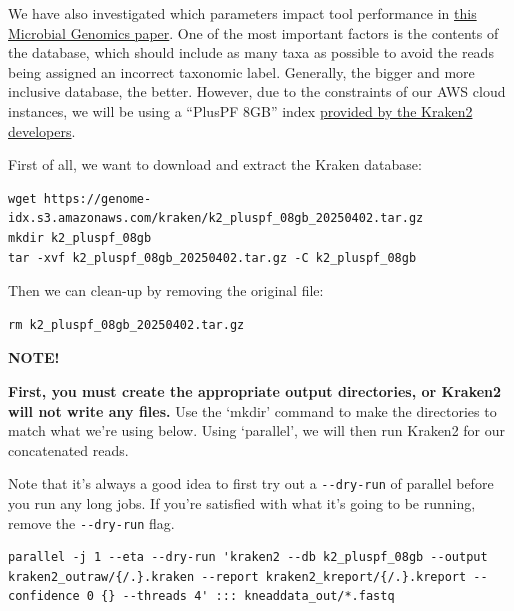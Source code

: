 \documentclass[
]{book}
\newenvironment{greenbox}{
  \definecolor{shadecolor}{RGB}{141, 181, 128}
  \color{white}
  \begin{shaded}}
 {\end{shaded}}
\begin{document}
We have also investigated which parameters impact tool performance in \href{https://pubmed.ncbi.nlm.nih.gov/36867161/}{this Microbial Genomics paper}. One of the most important factors is the contents of the database, which should include as many taxa as possible to avoid the reads being assigned an incorrect taxonomic label. Generally, the bigger and more inclusive database, the better. However, due to the constraints of our AWS cloud instances, we will be using a ``PlusPF 8GB'' index \href{https://benlangmead.github.io/aws-indexes/k2}{provided by the Kraken2 developers}.

First of all, we want to download and extract the Kraken database:

\begin{verbatim}
wget https://genome-idx.s3.amazonaws.com/kraken/k2_pluspf_08gb_20250402.tar.gz
mkdir k2_pluspf_08gb
tar -xvf k2_pluspf_08gb_20250402.tar.gz -C k2_pluspf_08gb
\end{verbatim}

Then we can clean-up by removing the original file:

\begin{verbatim}
rm k2_pluspf_08gb_20250402.tar.gz
\end{verbatim}

\begin{greenbox}

\begin{center}
\textbf{NOTE!}

\end{center}

\textbf{First, you must create the appropriate output directories, or Kraken2 will not write any files.} Use the `mkdir' command to make the directories to match what we're using below. Using `parallel', we will then run Kraken2 for our concatenated reads.

\end{greenbox}

Note that it's always a good idea to first try out a \texttt{-\/-dry-run} of parallel before you run any long jobs. If you're satisfied with what it's going to be running, remove the \texttt{-\/-dry-run} flag.

\begin{verbatim}
parallel -j 1 --eta --dry-run 'kraken2 --db k2_pluspf_08gb --output kraken2_outraw/{/.}.kraken --report kraken2_kreport/{/.}.kreport --confidence 0 {} --threads 4' ::: kneaddata_out/*.fastq
\end{verbatim}
\end{document}
